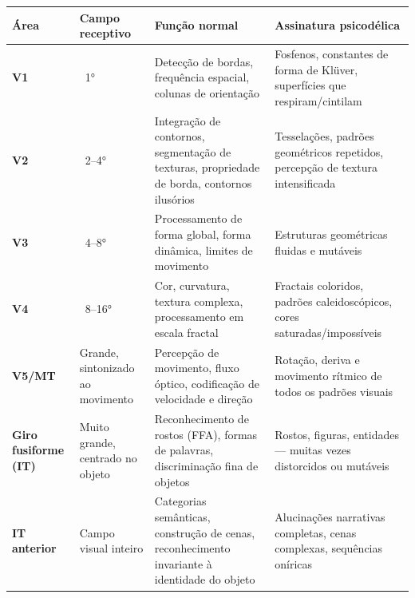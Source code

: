 \documentclass[11pt, twoside, openright]{book}
\begin{document}
\small
\begin{xltabular}{\linewidth}{X X X X}
\toprule
\textbf{Área} & \textbf{Campo receptivo} & \textbf{Função normal} & \textbf{Assinatura psicodélica} \\
\midrule\endhead
\textbf{V1} & ~1° & Detecção de bordas, frequência espacial, colunas de orientação & Fosfenos, constantes de forma de Klüver, superfícies que respiram/\allowbreak{}cintilam \\[4pt]
\textbf{V2} & ~2--4° & Integração de contornos, segmentação de texturas, propriedade de borda, contornos ilusórios & Tesselações, padrões geométricos repetidos, percepção de textura intensificada \\[4pt]
\textbf{V3} & ~4--8° & Processamento de forma global, forma dinâmica, limites de movimento & Estruturas geométricas fluidas e mutáveis \\[4pt]
\textbf{V4} & ~8--16° & Cor, curvatura, textura complexa, processamento em escala fractal & Fractais coloridos, padrões caleidoscópicos, cores saturadas/\allowbreak{}impossíveis \\[4pt]
\textbf{V5/\allowbreak{}MT} & Grande, sintonizado ao movimento & Percepção de movimento, fluxo óptico, codificação de velocidade e direção & Rotação, deriva e movimento rítmico de todos os padrões visuais \\[4pt]
\textbf{Giro fusiforme (IT)} & Muito grande, centrado no objeto & Reconhecimento de rostos (FFA), formas de palavras, discriminação fina de objetos & Rostos, figuras, entidades --- muitas vezes distorcidos ou mutáveis \\[4pt]
\textbf{IT anterior} & Campo visual inteiro & Categorias semânticas, construção de cenas, reconhecimento invariante à identidade do objeto & Alucinações narrativas completas, cenas complexas, sequências oníricas \\[4pt]
\bottomrule
\end{xltabular}
\normalsize
\end{document}
